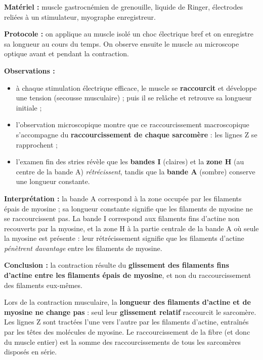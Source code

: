 \documentclass[11pt]{article}
\begin{document}
\begin{experience}
\textbf{Matériel :} muscle gastrocnémien de grenouille, liquide de Ringer, électrodes reliées à un stimulateur, myographe enregistreur.

\textbf{Protocole :} on applique au muscle isolé un choc électrique bref et on enregistre sa longueur au cours du temps. On observe ensuite le muscle au microscope optique avant et pendant la contraction.

\textbf{Observations :}
\begin{itemize}
\item à chaque stimulation électrique efficace, le muscle se \textbf{raccourcit} et développe une tension (secousse musculaire) ; puis il se relâche et retrouve sa longueur initiale ;
\item l'observation microscopique montre que ce raccourcissement macroscopique s'accompagne du \textbf{raccourcissement de chaque sarcomère} : les lignes Z se rapprochent ;
\item l'examen fin des stries révèle que les \textbf{bandes I} (claires) et la \textbf{zone H} (au centre de la bande A) \emph{rétrécissent}, tandis que la \textbf{bande A} (sombre) conserve une longueur constante.
\end{itemize}

\textbf{Interprétation :} la bande A correspond à la zone occupée par les filaments épais de myosine ; sa longueur constante signifie que les filaments de myosine ne se raccourcissent pas. La bande I correspond aux filaments fins d'actine non recouverts par la myosine, et la zone H à la partie centrale de la bande A où seule la myosine est présente : leur rétrécissement signifie que les filaments d'actine \emph{pénètrent davantage} entre les filaments de myosine.

\textbf{Conclusion :} la contraction résulte du \textbf{glissement des filaments fins d'actine entre les filaments épais de myosine}, et non du raccourcissement des filaments eux-mêmes.
\end{experience}

\begin{propriete}
Lors de la contraction musculaire, la \textbf{longueur des filaments d'actine et de myosine ne change pas} : seul leur \textbf{glissement relatif} raccourcit le sarcomère. Les lignes Z sont tractées l'une vers l'autre par les filaments d'actine, entraînés par les têtes des molécules de myosine. Le raccourcissement de la fibre (et donc du muscle entier) est la somme des raccourcissements de tous les sarcomères disposés en série.
\end{propriete}
\end{document}
